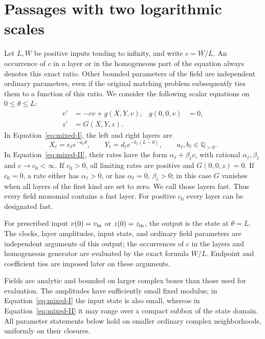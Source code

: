 \section{Passages with two logarithmic scales}\label{sec:mixed}

Let $L,W$ be positive inputs tending to infinity, and write $c=W/L$.
An occurrence of $c$ in a layer or in the homogeneous part of the
equation always denotes this exact ratio. Other bounded parameters of
the field are independent ordinary parameters, even if the original
matching problem subsequently ties them to a function of this ratio.
We consider the following scalar equations on $0\leq\theta\leq L$:
\begin{align}
 v'&=-cv+g(X,Y,v),&g(0,0,v)&=0,\label{eq:mixed-I}\\
 z'&=G(X,Y,z).&&\label{eq:mixed-II}
\end{align}
In Equation~\eqref{eq:mixed-I}, the left and right layers are
\[
 X_\ell=e_\ell e^{-a_\ell\theta},\qquad
 Y_\ell=d_\ell e^{-b_\ell(L-\theta)},\qquad a_\ell,b_\ell\in\mathbb Q_{>0}.
\]
In Equation~\eqref{eq:mixed-II}, their rates have the form
$\alpha_\ell+\beta_\ell c$, with rational $\alpha_\ell,\beta_\ell$ and
$c\to c_0<\infty$. If $c_0>0$, all limiting rates are positive and
$G(0,0,z)=0$. If $c_0=0$, a rate either has $\alpha_\ell>0$, or has
$\alpha_\ell=0$, $\beta_\ell>0$; in this case $G$ vanishes when all
layers of the first kind are set to zero. We call those layers fast.
Thus every field monomial contains a fast layer. For positive $c_0$
every layer can be designated fast.

For prescribed input $v(0)=v_{\rm in}$ or $z(0)=z_{\rm in}$, the
output is the state at $\theta=L$. The clocks, layer amplitudes, input
state, and ordinary field parameters are independent arguments of this
output; the occurrences of $c$ in the layers and homogeneous generator
are evaluated by the exact formula $W/L$. Endpoint and coefficient ties
are imposed later on these arguments.

Fields are analytic and bounded on larger complex boxes than those
used for evaluation. The amplitudes have sufficiently small fixed
modulus; in Equation~\eqref{eq:mixed-I} the input state is also small,
whereas in Equation~\eqref{eq:mixed-II} it may range over a compact
subbox of the state domain. All parameter statements below hold on
smaller ordinary complex neighborhoods, uniformly on their closures.

